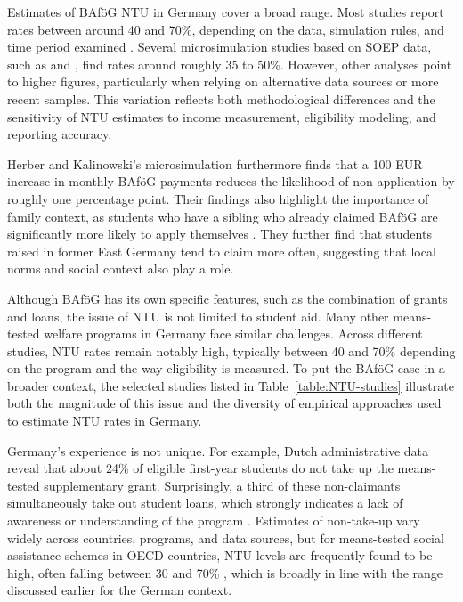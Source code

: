 Estimates of BAföG NTU in Germany cover a broad range. Most studies report rates between around 40 and 70\%, depending on the data, simulation rules, and time period examined \citep{goedeme_concept_2020}. Several microsimulation studies based on SOEP data, such as \citet{herber_non-take-up_2019} and \citet{bruckmeier_new_2012}, find rates around roughly 35 to 50\%. However, other analyses point to higher figures, particularly when relying on alternative data sources or more recent samples. This variation reflects both methodological differences and the sensitivity of NTU estimates to income measurement, eligibility modeling, and reporting accuracy.

Herber and Kalinowski’s microsimulation furthermore finds that a 100 EUR increase in monthly BAföG payments reduces the likelihood of non-application by roughly one percentage point. Their findings also highlight the importance of family context, as students who have a sibling who already claimed BAföG are significantly more likely to apply themselves \citep{frick_claim_2007, bruckmeier_new_2012}. They further find that students raised in former East Germany tend to claim more often, suggesting that local norms and social context also play a role.

Although BAföG has its own specific features, such as the combination of grants and loans, the issue of NTU is not limited to student aid. Many other means-tested welfare programs in Germany face similar challenges. Across different studies, NTU rates remain notably high, typically between 40 and 70\% depending on the program and the way eligibility is measured. To put the BAföG case in a broader context, the selected studies listed in Table~\ref{table:NTU-studies} illustrate both the magnitude of this issue and the diversity of empirical approaches used to estimate NTU rates in Germany.


% 

Germany’s experience is not unique. For example, Dutch administrative data reveal that about 24\% of eligible first-year students do not take up the means-tested supplementary grant. Surprisingly, a third of these non-claimants simultaneously take out student loans, which strongly indicates a lack of awareness or understanding of the program \citep{konijn_quantifying_2023}. Estimates of non-take-up vary widely across countries, programs, and data sources, but for means-tested social assistance schemes in OECD countries, NTU levels are frequently found to be high, often falling between 30 and 70\% \citep{goedeme_concept_2020}, which is broadly in line with the range discussed earlier for the German context.

